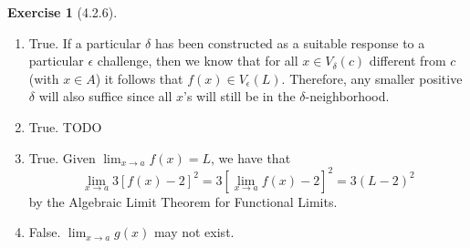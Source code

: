 \documentclass{amsart}
\theoremstyle{definition}
\newtheorem{exercise}{Exercise}
\begin{document}
\begin{exercise}[4.2.6]
  \begin{enumerate}[label={(\alph*)}]
    \item True. If a particular $\delta$ has been constructed as a suitable
      response to a particular $\epsilon$ challenge, then we know that for all
      $x \in V_\delta(c)$ different from $c$ (with $x \in A$) it follows that
      $f(x) \in V_\epsilon(L)$. Therefore, any smaller positive $\delta$ will
      also suffice since all $x$'s will still be in the $\delta$-neighborhood.
    \item True. TODO
    \item True. Given $\lim_{x \to a} f(x) = L$, we have that
      \[
        \lim_{x \to a} 3{[f(x) - 2]}^2 = 3{[\lim_{x \to a} f(x) - 2]}^2 = 3{(L -
        2)}^2
      \]
      by the Algebraic Limit Theorem for Functional Limits.
    \item False. $\lim_{x \to a} g(x)$ may not exist.
  \end{enumerate}
\end{exercise}
\end{document}
